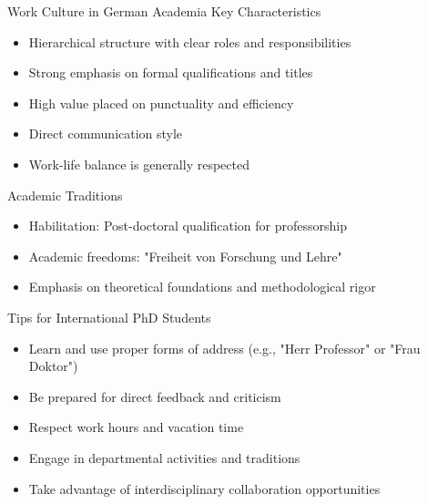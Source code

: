 \documentclass[aspectratio=169,10pt]{beamer}
\begin{document}
\begin{frame}{Work Culture in German Academia}
\alert{Key Characteristics}
\begin{itemize}
    \item Hierarchical structure with clear roles and responsibilities
    \item Strong emphasis on formal qualifications and titles
    \item High value placed on punctuality and efficiency
    \item Direct communication style
    \item Work-life balance is generally respected
\end{itemize}

\alert{Academic Traditions}
\begin{itemize}
    \item Habilitation: Post-doctoral qualification for professorship
    \item Academic freedoms: "Freiheit von Forschung und Lehre"
    \item Emphasis on theoretical foundations and methodological rigor
\end{itemize}

\alert{Tips for International PhD Students}
\begin{itemize}
    \item Learn and use proper forms of address (e.g., "Herr Professor" or "Frau Doktor")
    \item Be prepared for direct feedback and criticism
    \item Respect work hours and vacation time
    \item Engage in departmental activities and traditions
    \item Take advantage of interdisciplinary collaboration opportunities
\end{itemize}
\end{frame}
\end{document}
